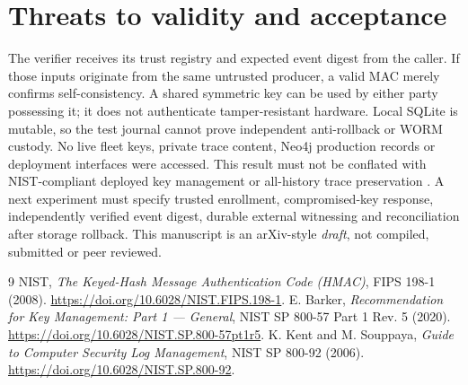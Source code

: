 \documentclass[11pt]{article}
\begin{document}
\section{Threats to validity and acceptance}
The verifier receives its trust registry and expected event digest from the caller. If those inputs originate from the same untrusted producer, a valid MAC merely confirms self-consistency. A shared symmetric key can be used by either party possessing it; it does not authenticate tamper-resistant hardware. Local SQLite is mutable, so the test journal cannot prove independent anti-rollback or WORM custody. No live fleet keys, private trace content, Neo4j production records or deployment interfaces were accessed. This result must not be conflated with NIST-compliant deployed key management or all-history trace preservation \cite{nist92}. A next experiment must specify trusted enrollment, compromised-key response, independently verified event digest, durable external witnessing and reconciliation after storage rollback. This manuscript is an arXiv-style \emph{draft}, not compiled, submitted or peer reviewed.
\begin{thebibliography}{9}
 NIST, \emph{The Keyed-Hash Message Authentication Code (HMAC)}, FIPS 198-1 (2008). \url{https://doi.org/10.6028/NIST.FIPS.198-1}.
 E. Barker, \emph{Recommendation for Key Management: Part 1 --- General}, NIST SP 800-57 Part 1 Rev. 5 (2020). \url{https://doi.org/10.6028/NIST.SP.800-57pt1r5}.
 K. Kent and M. Souppaya, \emph{Guide to Computer Security Log Management}, NIST SP 800-92 (2006). \url{https://doi.org/10.6028/NIST.SP.800-92}.
\end{thebibliography}
\end{document}
